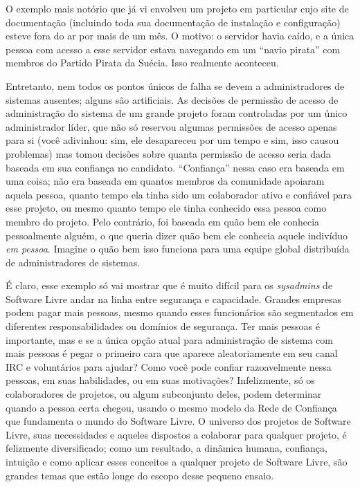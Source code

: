 O exemplo mais notório que já vi envolveu um projeto em particular cujo site de
documentação (incluindo toda sua documentação de instalação e configuração) esteve
fora do ar por mais de um mês. O motivo: o servidor havia caído, e a única pessoa
com acesso a esse servidor estava navegando em um ``navio pirata'' com membros do
Partido Pirata da Suécia. Isso realmente aconteceu.

Entretanto, nem todos os pontos únicos de falha se devem a administradores de
sistemas ausentes; alguns são artificiais. As decisões de permissão de acesso
de administração do sistema de um grande projeto foram controladas por um único
administrador líder, que não só reservou algumas permissões de acesso apenas para
si (você adivinhou: sim, ele desapareceu por um tempo e sim, isso causou problemas)
mas tomou decisões sobre quanta permissão de acesso seria dada baseada em sua
confiança no candidato. ``Confiança'' nessa caso era baseada em uma coisa; não
era baseada em quantos membros da comunidade apoiaram aquela pessoa, quanto tempo
ela tinha sido um colaborador ativo e confiável para esse projeto, ou mesmo quanto
tempo ele tinha conhecido essa pessoa como membro do projeto. Pelo contrário, foi
baseada em quão bem ele conhecia pessoalmente alguém, o que queria dizer quão bem
ele conhecia aquele indivíduo \emph{em pessoa}. Imagine o quão bem isso funciona
para uma equipe global distribuída de administradores de sistemas.

É claro, esse exemplo só vai mostrar que é muito difícil para os \textit{sysadmins}
de Software Livre andar na linha entre segurança e capacidade. Grandes empresas podem
pagar mais pessoas, mesmo quando esses funcionários são segmentados em diferentes
responsabilidades ou domínios de segurança. Ter mais pessoas é importante,
mas e se a única opção atual para administração de sistema com mais pessoas é pegar
o primeiro cara que aparece aleatoriamente em seu canal IRC e voluntários para
ajudar? Como você pode confiar razoavelmente nessa pessoas, em suas habilidades,
ou em suas motivações? Infelizmente, só os colaboradores de projetos, ou algum
subconjunto deles, podem determinar quando a pessoa certa chegou, usando o mesmo
modelo da Rede de Confiança que fundamenta o mundo do Software Livre. O universo 
dos projetos de Software Livre, suas necessidades e aqueles dispostos a colaborar
para qualquer projeto, é felizmente diversificado; como um resultado, a dinâmica
humana, confiança, intuição e como aplicar esses conceitos a qualquer projeto de
Software Livre, são grandes temas que estão longe do escopo desse pequeno ensaio.

